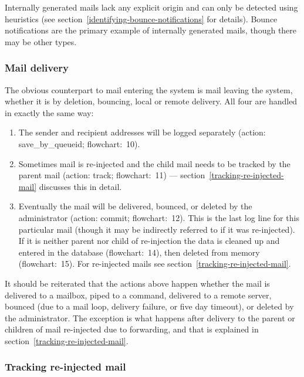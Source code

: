 \documentclass[a4paper,12pt,draft]{article}
\begin{document}
Internally generated mails lack any explicit origin and can only be
detected using heuristics (see
section~\ref{identifying-bounce-notifications} for details).  Bounce
notifications are the primary example of internally generated mails, though
there may be other types.

\subsubsection{Mail delivery}

\label{mail-delivery}

The obvious counterpart to mail entering the system is mail leaving the
system, whether it is by deletion, bouncing, local or remote delivery.  All
four are handled in exactly the same way:

\begin{enumerate}

    \item The sender and recipient addresses will be logged separately
        (action: save\_by\_queueid; flowchart:~10).

    \item Sometimes mail is re-injected and the child mail needs to be
        tracked by the parent mail (action: track; flowchart:~11) ---
        section~\ref{tracking-re-injected-mail} discusses this in detail.

    \item Eventually the mail will be delivered, bounced, or deleted by the
        administrator (action: commit; flowchart:~12).  This is the last
        log line for this particular mail (though it may be indirectly
        referred to if it was re-injected).  If it is neither parent nor
        child of re-injection the data is cleaned up and entered in the
        database (flowchart:~14), then deleted from memory (flowchart:~15).  For
        re-injected mails see section~\ref{tracking-re-injected-mail}.

\end{enumerate}

It should be reiterated that the actions above happen whether the mail is
delivered to a mailbox, piped to a command, delivered to a remote server,
bounced (due to a mail loop, delivery failure, or five day timeout), or
deleted by the administrator.  The exception is what happens after delivery
to the parent or children of mail re-injected due to forwarding, and that
is explained in section~\ref{tracking-re-injected-mail}.

\subsubsection{Tracking re-injected mail}
\end{document}
